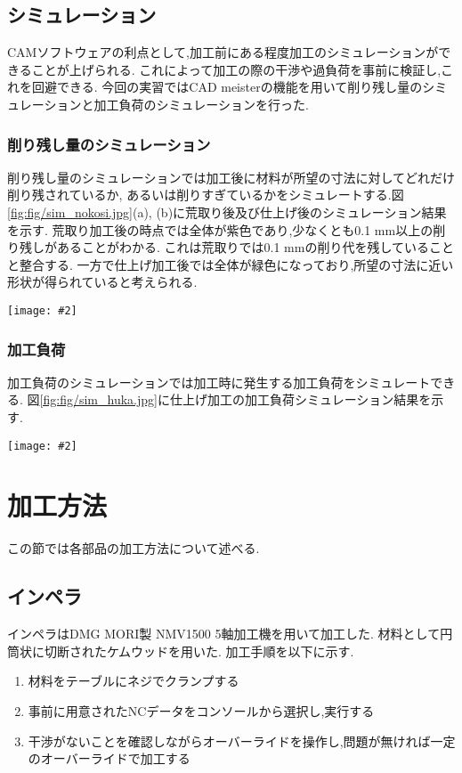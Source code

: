 \documentclass[uplatex,a4j,11pt,dvipdfmx]{jsreport}
\makeatletter
\def\fgcaption{\def\@captype{figure}\caption}
\newcommand{\mfig}[3][width=15cm]{
\begin{center}
\texttt{[image: \#2]}
\fgcaption{#3 \label{fig:#2}}
\end{center}
}
\makeatother
\begin{document}
  \subsection{シミュレーション}
  CAMソフトウェアの利点として,加工前にある程度加工のシミュレーションができることが上げられる.
  これによって加工の際の干渉や過負荷を事前に検証し,これを回避できる.
  今回の実習ではCAD meisterの機能を用いて削り残し量のシミュレーションと加工負荷のシミュレーションを行った.
  \subsubsection*{削り残し量のシミュレーション}
  削り残し量のシミュレーションでは加工後に材料が所望の寸法に対してどれだけ削り残されているか,
  あるいは削りすぎているかをシミュレートする.図\ref{fig:fig/sim_nokosi.jpg}(a), (b)に荒取り後及び仕上げ後のシミュレーション結果を示す.
  荒取り加工後の時点では全体が紫色であり,少なくとも0.1 mm以上の削り残しがあることがわかる.
  これは荒取りでは0.1 mmの削り代を残していることと整合する.
  一方で仕上げ加工後では全体が緑色になっており,所望の寸法に近い形状が得られていると考えられる.
  \mfig[width=14cm]{fig/sim_nokosi.jpg}{(a)荒取り後の削り残し量, (b)仕上げ後の削り残し量}
  \subsubsection*{加工負荷}
  加工負荷のシミュレーションでは加工時に発生する加工負荷をシミュレートできる.
  図\ref{fig:fig/sim_huka.jpg}に仕上げ加工の加工負荷シミュレーション結果を示す.
  \mfig[width=7cm]{fig/sim_huka.jpg}{仕上げ加工の加工負荷}
  \section{加工方法}
  この節では各部品の加工方法について述べる.
  \subsection{インペラ}
  インペラはDMG MORI製 NMV1500 5軸加工機を用いて加工した.
  材料として円筒状に切断されたケムウッドを用いた.
  加工手順を以下に示す.
  \begin{enumerate}
    \item 材料をテーブルにネジでクランプする
    \item 事前に用意されたNCデータをコンソールから選択し,実行する
    \item 干渉がないことを確認しながらオーバーライドを操作し,問題が無ければ一定のオーバーライドで加工する
  \end{enumerate}
\end{document}
